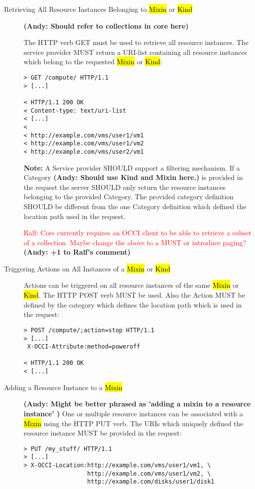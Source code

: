 \documentclass[10pt,a4paper]{article}
\newcommand{\ralf}[1]{\textcolor{red}{Ralf: #1}}
\begin{document}
\begin{description}
\item[Retrieving All Resource Instances Belonging to \hl{Mixin} or
  \hl{Kind}] 
  
  \textbf{(Andy: Should refer to collections in core here)}
  
  The HTTP verb GET must be used to retrieve all resource
  instances. The service provider MUST return a URI-list containing
  all resource instances which belong to the requested \hl{Mixin} or
  \hl{Kind}:
\begin{verbatim}
> GET /compute/ HTTP/1.1
> [...]
 
< HTTP/1.1 200 OK
< Content-type: text/uri-list
< [...]
< 
< http://example.com/vms/user1/vm1
< http://example.com/vms/user1/vm2
< http://example.com/vms/user2/vm1
\end{verbatim}
\textbf{Note:} A Service provider SHOULD support a filtering
mechanism. If a Category \textbf{(Andy: Should use Kind and Mixin here.)} is provided in the request the server SHOULD
only return the resource instances belonging to the provided
Category. The provided category definition SHOULD be different from
the one Category definition which defined the location path used in
the request.

\ralf{Core currently requires an OCCI client to be able to retrieve a subset of
a collection.  Maybe change the above to a MUST or introduce paging?}
\textbf{(Andy: +1 to Ralf's comment)}

\item[Triggering Actions on All Instances of a \hl{Mixin} or
  \hl{Kind}] Actions can be triggered on all resource instances of the
  same \hl{Mixin} or \hl{Kind}. The HTTP POST verb MUST be used. Also
  the Action MUST be defined by the category which defines the
  location path which is used in the request:
\begin{verbatim}
> POST /compute/;action=stop HTTP/1.1
> [...]
 X-OCCI-Attribute:method=poweroff

< HTTP/1.1 200 OK
< [...]
\end{verbatim}

\item[Adding a Resource Instance to a \hl{Mixin}] 
\textbf{(Andy: Might be better phrased as 'adding a mixin to a resource instance' )} 
One or multiple
  resource instances can be associated with a \hl{Mixin} using the HTTP PUT
  verb. The URIs which uniquely defined the resource instance MUST be
  provided in the request:
\begin{verbatim}
> PUT /my_stuff/ HTTP/1.1
> [...]
> X-OCCI-Location:http://example.com/vms/user1/vm1, \
                  http://example.com/vms/user1/vm2, \
                  http://example.com/disks/user1/disk1


\end{verbatim}
\end{description}
\end{document}
